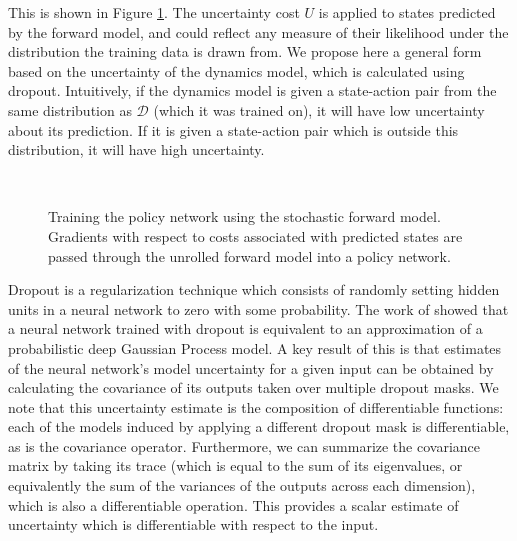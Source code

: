 \documentclass{article} %
\begin{document}
        This is shown in Figure \ref{svg}. The uncertainty cost $U$ is applied to states predicted by the forward model, and could reflect any measure of their likelihood under the distribution the training data is drawn from.
        We propose here a general form based on the uncertainty of the dynamics model, which is calculated using dropout.
        Intuitively, if the dynamics model is given a state-action pair from the same distribution as $\mathcal{D}$ (which it was trained on), it will have low uncertainty about its prediction.
        If it is given a state-action pair which is outside this distribution, it will have high uncertainty.

\begin{figure}[t!]
    \centering
     \\
    \caption{Training the policy network using the stochastic forward model. Gradients with respect to costs associated with predicted states are passed through the unrolled forward model into a policy network.}
    \label{svg}
\end{figure}


    Dropout \citep{Dropout2012, Dropout2014} is a regularization technique which consists of randomly setting hidden units in a neural network to zero with some probability.
    The work of \citep{Gal16} showed that a neural network trained with dropout is equivalent to an approximation of a probabilistic deep Gaussian Process model.
    A key result of this is that estimates of the neural network's model uncertainty for a given input can be obtained by calculating the covariance of its outputs taken over multiple dropout masks.
    We note that this uncertainty estimate is the composition of differentiable functions: each of the models induced by applying a different dropout mask is differentiable, as is the covariance operator.
    Furthermore, we can summarize the covariance matrix by taking its trace (which is equal to the sum of its eigenvalues, or equivalently the sum of the variances of the outputs across each dimension), which is also a differentiable operation. This provides a scalar estimate of uncertainty which is differentiable with respect to the input.
\end{document}
